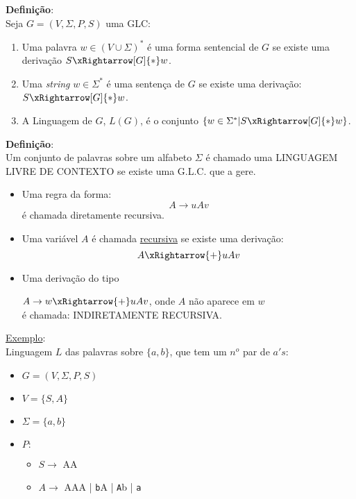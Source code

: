 \textbf{Definição}:\\

Seja $G = (V, \Sigma, P, S)$ uma GLC:
\begin{enumerate}
  \item Uma palavra $w \in (V \cup \Sigma)^{*}$ é uma {\color{red}forma sentencial} de $G$ se existe uma derivação $S \xRightarrow[G]{*} w$.
  \item Uma \textit{string} $w \in \Sigma^{*}$ é uma {\color{red}sentença} de $G$ se existe uma derivação:\\
  $S \xRightarrow[G]{\ast} w$.
  \item A {\color{red} Linguagem de $G$}, $L(G)$, é o conjunto $\{ w \in \Sigma^{*} | S \xRightarrow[G]{*} w \}$.
\end{enumerate}

\textbf{Definição}:\\
Um conjunto de palavras sobre um alfabeto $\Sigma$ é chamado uma {\color{red}LINGUAGEM LIVRE DE CONTEXTO} se existe uma G.L.C. que a gere.

\begin{itemize}
  \item Uma regra da forma:
    \[
      A \rightarrow uAv
    \]
    é chamada {\color{red}diretamente recursiva}.
  \item Uma variável $A$ é chamada \underline{recursiva} se existe uma derivação:
    \[
      A \xRightarrow{+} uAv
    \]
  \item Uma derivação do tipo
    \begin{center}
      $A \rightarrow w \xRightarrow{+} uAv$, onde $A$ não aparece em $w$\\
      é chamada: {\color{red}INDIRETAMENTE RECURSIVA}.
    \end{center}
\end{itemize}

\underline{Exemplo}: \\

Linguagem $L$ das palavras sobre $\{a,b\}$, que tem um $n^{o}$ par de $a's$:\\
\begin{itemize}
 \item[] $G = (V, \Sigma, P, S)$
 \item[] $V = \{S,A\}$
 \item[] $\Sigma = \{a,b\}$
 \item[] $P:$\\
    \begin{itemize}
     \item[] $S \rightarrow$ AA
     \item[] $A \rightarrow$ AAA | \texttt{b}A | \texttt{A}b | \texttt{a}
    \end{itemize}
\end{itemize}

